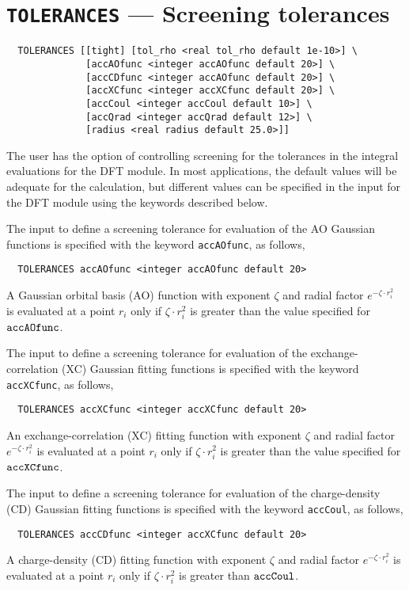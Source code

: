 \section{{\tt TOLERANCES} --- Screening tolerances}

\begin{verbatim}
  TOLERANCES [[tight] [tol_rho <real tol_rho default 1e-10>] \
              [accAOfunc <integer accAOfunc default 20>] \
              [accCDfunc <integer accAOfunc default 20>] \
              [accXCfunc <integer accXCfunc default 20>] \
              [accCoul <integer accCoul default 10>] \
              [accQrad <integer accQrad default 12>] \
              [radius <real radius default 25.0>]]
\end{verbatim}
%
%
The user has the option of controlling screening for the tolerances in
the integral evaluations for the DFT module.  In most applications,
the default values will be adequate for the calculation, but different
values can be specified in the input for the DFT module using the
keywords described below.

The input to define a screening tolerance for evaluation of the AO 
Gaussian functions is specified with the keyword \verb+accAOfunc+, as
follows,
\begin{verbatim}
  TOLERANCES accAOfunc <integer accAOfunc default 20>
\end{verbatim}
A Gaussian orbital basis (AO) function with exponent $\zeta$
and radial factor $e^{-\zeta\cdot r_i^2}$ is 
evaluated  at a point $r_i$ only if 
$\zeta\cdot r_i^2$ is greater than the value specified for ${\tt accAOfunc}$.

The input to define a screening tolerance for evaluation of the exchange-
correlation (XC) Gaussian fitting functions is specified with the
keyword \verb+accXCfunc+, as follows,
\begin{verbatim}
  TOLERANCES accXCfunc <integer accXCfunc default 20>
\end{verbatim}
An exchange-correlation (XC) fitting function with exponent $\zeta$
and radial factor $e^{-\zeta\cdot r_i^2}$ is 
evaluated  at a point $r_i$ only if 
$\zeta\cdot r_i^2$ is greater than the value specified for ${\tt accXCfunc}$.

The input to define a screening tolerance for evaluation of the
charge-density (CD) Gaussian fitting functions is specified with the
keyword \verb+accCoul+, as follows,
\begin{verbatim}
  TOLERANCES accCDfunc <integer accXCfunc default 20>
\end{verbatim}
A  charge-density (CD) fitting function with exponent $\zeta$
and radial factor $e^{-\zeta\cdot r_i^2}$ is evaluated  at a 
point $r_i$ only if $\zeta\cdot r_i^2$ is greater than ${\tt
  accCoul}$.



